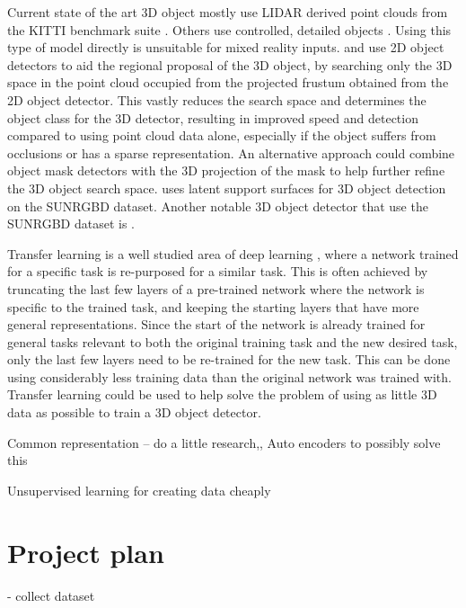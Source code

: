 \documentclass[11pt]{article}
\begin{document}
Current state of the art 3D object mostly use LIDAR derived point clouds from the KITTI benchmark suite \cite{point_fusion}\cite{multi_fusion}\cite{fast_furious}\cite{VoxelNet}. Others use controlled, detailed objects \cite{subgroup_voting}\cite{pose_RGBD}\cite{real_time_single}. Using this type of model directly is unsuitable for mixed reality inputs. \cite{PointNets} and \cite{frustum} use 2D object detectors to aid the regional proposal of the 3D object, by searching only the 3D space in the point cloud occupied from the projected frustum obtained from the 2D object detector. This vastly reduces the search space and determines the object class for the 3D detector, resulting in improved speed and detection compared to using point cloud data alone, especially if the object suffers from occlusions or has a sparse representation. An alternative approach could combine object mask detectors\cite{first_person_mask}\cite{mask_RCNN} with the 3D projection of the mask to help further refine the 3D object search space. \cite{latent_surface} uses latent support surfaces for 3D object detection on the SUNRGBD dataset. Another notable 3D object detector that use the SUNRGBD dataset is \cite{SnapNet}. 

Transfer learning is a well studied area of deep learning \cite{DeCAF}\cite{survery_on_transfer}\cite{how_transferable}, where a network trained for a specific task is re-purposed for a similar task. This is often achieved by truncating the last few layers of a pre-trained network where the network is specific to the trained task, and keeping the starting layers that have more general representations. Since the start of the network is already trained for general tasks relevant to both the original training task and the new desired task, only the last few layers need to be re-trained for the new task. This can be done using considerably less training data than the original network was trained with. Transfer learning could be used to help solve the problem of using as little 3D data as possible to train a 3D object detector.

Common representation -- do a little research,,
	Auto encoders to possibly solve this 

Unsupervised learning for creating data cheaply


\section{Project plan}

- collect dataset
\end{document}
